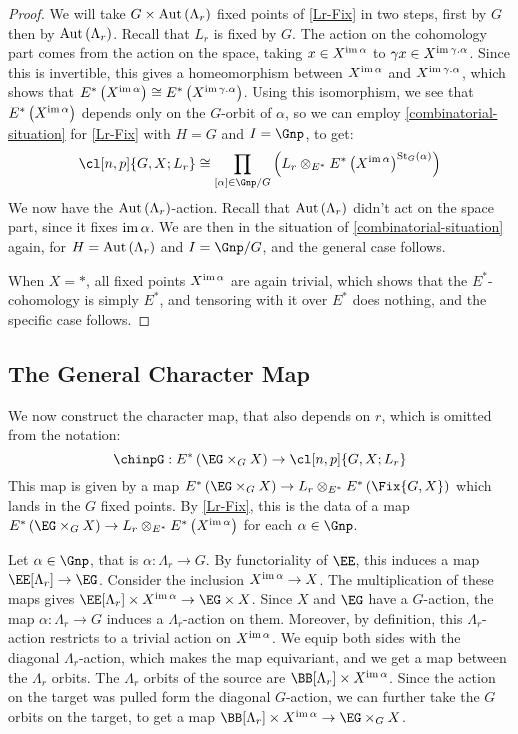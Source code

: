 \begin{proof}
	We will take $G \times \operatorname{Aut} \left(\Lambda_r\right)$ fixed points of \ref{Lr-Fix} in two steps, first by $G$ then by $\operatorname{Aut} \left(\Lambda_r\right)$.
	Recall that $L_r$ is fixed by $G$.
	The action on the cohomology part comes from the action on the space, taking $x \in X^{\operatorname{im} \alpha}$ to $\gamma x \in X^{\operatorname{im} \gamma.\alpha}$.
	Since this is invertible, this gives a homeomorphism between $X^{\operatorname{im} \alpha}$ and $X^{\operatorname{im} \gamma.\alpha}$, which shows that $E^*\left(X^{\operatorname{im} \alpha}\right) \cong E^*\left(X^{\operatorname{im} \gamma.\alpha}\right)$.
	Using this isomorphism, we see that $E^*\left(X^{\operatorname{im} \alpha}\right)$ depends only on the $G$-orbit of $\alpha$, so we can employ \ref{combinatorial-situation} for \ref{Lr-Fix} with $H = G$ and $I = \Gnp$, to get:
	$$
	\cl[n,p]{G,X; L_r}
	\cong \prod_{\left[\alpha\right] \in \Gnp/G} \left(L_r \otimes_{E^*} E^*\left(X^{\im \alpha}\right)^{\stab_G\left(\alpha\right)}\right)
	$$
	We now have the $\operatorname{Aut} \left(\Lambda_r\right)$-action.
	Recall that $\operatorname{Aut} \left(\Lambda_r\right)$ didn't act on the space part, since it fixes $\operatorname{im} \alpha$.
	We are then in the situation of \ref{combinatorial-situation} again, for $H = \operatorname{Aut} \left(\Lambda_r\right)$ and $I = \Gnp/G$, and the general case follows.
	
	When $X = *$, all fixed points $X^{\operatorname{im} \alpha}$ are again trivial, which shows that the $E^*$-cohomology is simply $E^*$, and tensoring with it over $E^*$ does nothing, and the specific case follows.
\end{proof}



\subsection{The General Character Map}

We now construct the character map, that also depends on $r$, which is omitted from the notation:
$$\chinpG: E^*\left(\EG \times_G X\right) \to \cl[n,p]{G,X; L_r}$$
This map is given by a map $E^*\left(\EG \times_G X\right) \to L_r \otimes_{E^*} E^*\left(\Fix{G,X}\right)$ which lands in the $G$ fixed points.
By \ref{Lr-Fix}, this is the data of a map $E^*\left(\EG \times_G X\right) \to L_r \otimes_{E^*} E^*\left(X^{\im \alpha}\right)$ for each $\alpha \in \Gnp$.

Let $\alpha \in \Gnp$, that is $\alpha: \Lambda_r \to G$.
By functoriality of $\EE$, this induces a map $\EE[\Lambda_r] \to \EG$.
Consider the inclusion $X^{\operatorname{im} \alpha} \to X$.
The multiplication of these maps gives $\EE[\Lambda_r] \times X^{\im \alpha} \to \EG \times X$.
Since $X$ and $\EG$ have a $G$-action, the map $\alpha: \Lambda_r \to G$ induces a $\Lambda_r$-action on them.
Moreover, by definition, this $\Lambda_r$-action restricts to a trivial action on $X^{\operatorname{im} \alpha}$.
We equip both sides with the diagonal $\Lambda_r$-action, which makes the map equivariant, and we get a map between the $\Lambda_r$ orbits.
The $\Lambda_r$ orbits of the source are $\BB[\Lambda_r] \times X^{\im \alpha}$.
Since the action on the target was pulled form the diagonal $G$-action, we can further take the $G$ orbits on the target, to get a map $\BB[\Lambda_r] \times X^{\im \alpha} \to \EG \times_G X$.

